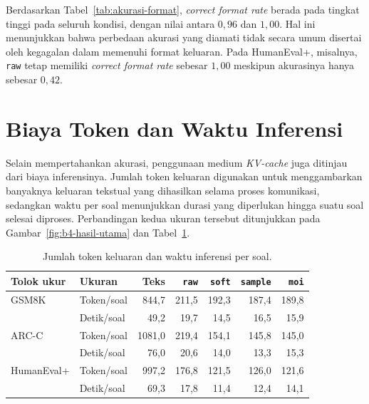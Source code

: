 Berdasarkan Tabel~\ref{tab:akurasi-format}, \textit{correct format rate} berada pada
tingkat tinggi pada seluruh kondisi, dengan nilai antara $0{,}96$ dan
$1{,}00$. Hal ini menunjukkan bahwa perbedaan akurasi yang diamati tidak
secara umum disertai oleh kegagalan dalam memenuhi format keluaran. Pada
HumanEval+, misalnya, \texttt{raw} tetap memiliki \textit{correct format rate} sebesar
$1{,}00$ meskipun akurasinya hanya sebesar $0{,}42$.

\section{Biaya Token dan Waktu Inferensi}
\label{sec:biaya-token-waktu-inferensi}

Selain mempertahankan akurasi, penggunaan medium \textit{KV-cache} juga
ditinjau dari biaya inferensinya. Jumlah token keluaran digunakan untuk
menggambarkan banyaknya keluaran tekstual yang dihasilkan selama proses
komunikasi, sedangkan waktu per soal menunjukkan durasi yang diperlukan hingga
suatu soal selesai diproses. Perbandingan kedua ukuran tersebut ditunjukkan
pada Gambar~\ref{fig:b4-hasil-utama} dan Tabel~\ref{tab:biaya-inferensi}.

\begin{table}[H]
    \centering
    \caption{Jumlah token keluaran dan waktu inferensi per soal.}
    \label{tab:biaya-inferensi}
    \small
    \begin{tabular}{llrrrrr}
        \hline
        Tolok ukur & Ukuran & Teks & \texttt{raw} & \texttt{soft}
        & \texttt{sample} & \texttt{moi} \\
        \hline
        GSM8K & Token/soal
        & 844,7 & 211,5 & 192,3 & 187,4 & 189,8 \\
        & Detik/soal
        & 49,2 & 19,7 & 14,5 & 16,5 & 15,9 \\
        \hline
        ARC-C & Token/soal
        & 1081,0 & 219,4 & 154,1 & 145,8 & 145,0 \\
        & Detik/soal
        & 76,0 & 20,6 & 14,0 & 13,3 & 15,3 \\
        \hline
        HumanEval+ & Token/soal
        & 997,2 & 176,8 & 121,5 & 126,0 & 121,6 \\
        & Detik/soal
        & 69,3 & 17,8 & 11,4 & 12,4 & 14,1 \\
        \hline
    \end{tabular}
\end{table}

